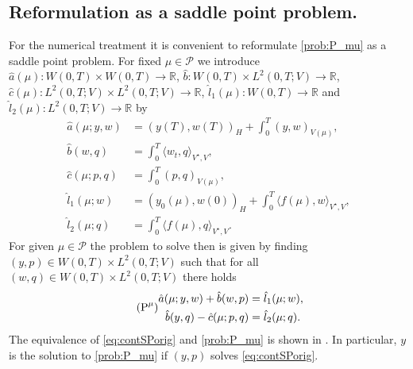 \documentclass{article}
\theoremstyle{plain}
\theoremstyle{definition}
\theoremstyle{remark}
\newcommand{\RR}{\mathbb{R}}
\begin{document}
\subsection{Reformulation as a saddle point problem.}
For the numerical treatment it is convenient to reformulate \eqref{prob:P_mu} as a saddle point problem. For fixed $\mu \in \mathcal{P}$ we introduce $\hat{a}(\mu) : W(0,T) \times W(0,T) \to \RR$, $\hat{b} : W(0,T) \times L^2(0,T; V) \to \RR$, $\hat{c}(\mu) : L^2(0,T; V) \times L^2(0,T; V) \to \RR$, $\hat{l}_1(\mu) : W(0,T) \to \RR$ and $\hat{l}_2(\mu) : L^2(0,T; V) \to \RR$ by
\begin{align}
    \hat{a}(\mu; y,w) &= (y(T),w(T))_H  + \int_0^T(y,w)_{V(\mu)} ,\\
    \hat{b}(w,q) &=  \int_0^T\langle w_t,q\rangle_{V^\star,V} , \\
    \hat{c}(\mu; p,q) &= \int_0^T(p,q)_{V(\mu)} ,\\
    \hat{l}_1(\mu; w) &= (y_0(\mu),w(0))_H  + \int_0^T\langle f(\mu), w \rangle_{V^\star,V} ,\\
    \hat{l}_2(\mu; q) &= \int_0^T \langle f(\mu), q \rangle_{V^\star,V}.
\end{align}
For given $\mu \in \mathcal P$ the problem to solve then is given by finding $(y,p) \in W(0,T)\times L^2(0,T;V)$ such that for all $(w,q) \in W(0,T)\times L^2(0,T;V)$ there holds
\begin{equation}\label{eq:contSPorig}\tag{\ensuremath{\text P^\mu}}
\begin{aligned}
    \hat{a}(\mu; y,w) + \hat{b}(w,p) &= \hat{l}_1(\mu; w),\\
    \hat{b}(y,q) -\hat{c}(\mu; p,q) &= \hat{l}_2(\mu; q).
\end{aligned}    
\end{equation}
The equivalence of \eqref{eq:contSPorig} and \eqref{prob:P_mu} is shown in \cite[Lemma 2.6]{preprint_SP}. In particular, $y$ is the solution to \eqref{prob:P_mu} if $(y,p)$ solves \eqref{eq:contSPorig}.
\end{document}
